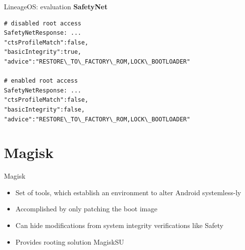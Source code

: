 \documentclass[
    11pt,%
    aspectratio=169,%
]{beamer}
\begin{document}
\begin{frame}[fragile]{LineageOS: evaluation}
\textbf{SafetyNet}

\begin{verbatim}
# disabled root access
SafetyNetResponse: ...
"ctsProfileMatch":false,
"basicIntegrity":true,
"advice":"RESTORE\_TO\_FACTORY\_ROM,LOCK\_BOOTLOADER"

# enabled root access
SafetyNetResponse: ...
"ctsProfileMatch":false,
"basicIntegrity":false,
"advice":"RESTORE\_TO\_FACTORY\_ROM,LOCK\_BOOTLOADER"
\end{verbatim}
\end{frame}



%
%
\section{Magisk}

\begin{frame}{Magisk}
\begin{itemize}
  \item Set of tools, which establish an environment to alter Android \alert{systemless-ly}\newline
  \item Accomplished by only patching the boot image\newline
  \item Can hide modifications from system integrity verifications like Safety\newline
  \item Provides rooting solution MagiskSU
\end{itemize}
\end{frame}
\end{document}
